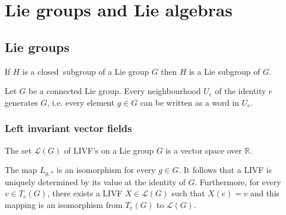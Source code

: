 \chapter{Lie groups and Lie algebras}\label{chapter:lie}
\section{Lie groups}
    
	
	\begin{theorem}
		If $H$ is a closed\footnotemark\ subgroup of a Lie group $G$ then $H$ is a Lie subgroup of $G$.
	\end{theorem}
	
	\begin{property}\label{lie:prop_connected}
		Let $G$ be a connected Lie group. Every neighbourhood $U_e$ of the identity $e$ generates $G$, i.e. every element $g\in G$ can be written as a word in $U_e$.
	\end{property}

\subsection{Left invariant vector fields}
	
	\begin{property}
		The set $\mathcal{L}(G)$ of LIVF's on a Lie group $G$ is a vector space over $\mathbb{R}$.
	\end{property}
	\begin{property}
		\label{lie:livf_prop}
		The map $L_{g,\ast}$ is an isomorphism for every $g\in G$. It follows that a LIVF is uniquely determined by its value at the identity of $G$. Furthermore, for every $v\in T_e(G)$, there exists a LIVF $X\in\mathcal{L}(G)$ such that $X(e) = v$ and this mapping is an isomorphism from $T_e(G)$ to $\mathcal{L}(G)$.
	\end{property}

